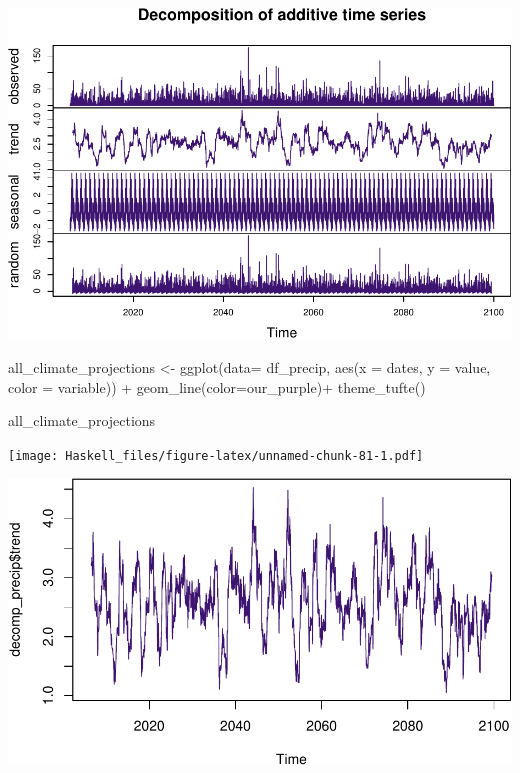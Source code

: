 \documentclass[
  paper=a4,
  ,captions=tableheading
]{scrartcl}
\newenvironment{Shaded}{\begin{snugshade}}{\end{snugshade}}
\newcommand{\AttributeTok}[1]{\textcolor[rgb]{0.77,0.63,0.00}{#1}}
\newcommand{\FunctionTok}[1]{\textcolor[rgb]{0.00,0.00,0.00}{#1}}
\newcommand{\NormalTok}[1]{#1}
\newcommand{\OtherTok}[1]{\textcolor[rgb]{0.56,0.35,0.01}{#1}}
\newcommand{\SpecialCharTok}[1]{\textcolor[rgb]{0.00,0.00,0.00}{#1}}
\begin{document}
\includegraphics{Haskell_files/figure-latex/unnamed-chunk-80-1.pdf}

\begin{Shaded}
\begin{Highlighting}[]
\NormalTok{all\_climate\_projections }\OtherTok{\textless{}{-}} \FunctionTok{ggplot}\NormalTok{(}\AttributeTok{data=}\NormalTok{ df\_precip, }\FunctionTok{aes}\NormalTok{(}\AttributeTok{x =}\NormalTok{ dates, }\AttributeTok{y =}\NormalTok{ value, }\AttributeTok{color =}\NormalTok{ variable)) }\SpecialCharTok{+} 
  \FunctionTok{geom\_line}\NormalTok{(}\AttributeTok{color=}\NormalTok{our\_purple)}\SpecialCharTok{+}
  \FunctionTok{theme\_tufte}\NormalTok{()}

\NormalTok{all\_climate\_projections}
\end{Highlighting}
\end{Shaded}

\texttt{[image: Haskell\_files/figure-latex/unnamed-chunk-81-1.pdf]}

\begin{Shaded}
\end{Shaded}

\includegraphics{Haskell_files/figure-latex/unnamed-chunk-82-1.pdf}
\end{document}

